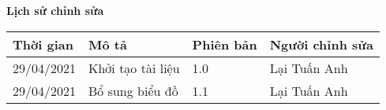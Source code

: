 \documentclass[./main.tex]{subfiles}
\begin{document}
\begin{center}
	\Large{\textbf{Lịch sử chỉnh sửa}}
	\begin{table}[H]
		\begin{tabular}{|p{}|p{}|p{}|p{}|}
			\hline
			\textbf{Thời gian} & \textbf{Mô tả}    & \textbf{Phiên bản} & \textbf{Người chỉnh sửa} \\ \hline
			29/04/2021         & Khởi tạo tài liệu & 1.0                & Lại Tuấn Anh             \\\hline
			29/04/2021         & Bổ sung biểu đồ   & 1.1                & Lại Tuấn Anh             \\\hline
		\end{tabular}
	\end{table}
\end{center}
\end{document}
